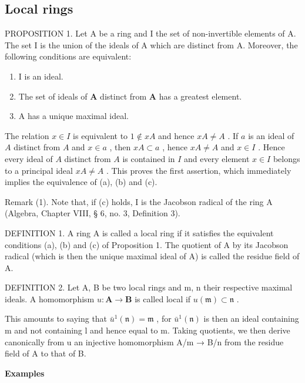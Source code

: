 \subsection{Local rings}

PROPOSITION 1. Let A be a ring and I the set of non-invertible elements of A. The set I is the union of the ideals of A which are distinct from A. Moreover, the following conditions are equivalent:

\begin{enumerate}
\def\labelenumi{(\alph{enumi})}
\item
  I is an ideal.
\item
  The set of ideals of \(\mathbf{A}\) distinct from \(\mathbf{A}\) has a greatest element.
\item
  A has a unique maximal ideal.
\end{enumerate}

The relation \(x \in I\) is equivalent to \(1 \notin xA\) and hence \(xA \neq A\) . If \(a\) is an ideal of \(A\) distinct from \(A\) and \(x \in a\) , then \(xA \subset a\) , hence \(xA \neq A\) and \(x \in I\) . Hence every ideal of \(A\) distinct from \(A\) is contained in \(I\) and every element \(x \in I\) belongs to a principal ideal \(xA \neq A\) . This proves the first assertion, which immediately implies the equivalence of (a), (b) and (c).

Remark (1). Note that, if (c) holds, I is the Jacobson radical of the ring A (Algebra, Chapter VIII, § 6, no. 3, Definition 3).

DEFINITION 1. A ring A is called a local ring if it satisfies the equivalent conditions (a), (b) and (c) of Proposition 1. The quotient of A by its Jacobson radical (which is then the unique maximal ideal of A) is called the residue field of A.

DEFINITION 2. Let A, B be two local rings and m, n their respective maximal ideals. A homomorphism \(u: \mathbf{A} \to \mathbf{B}\) is called local if \(u(\mathfrak{m}) \subset \mathfrak{n}\) .

This amounts to saying that \(\bar{u}^{1}(\mathfrak{n}) = \mathfrak{m}\) , for \(\bar{u}^{1}(\mathfrak{n})\) is then an ideal containing m and not containing l and hence equal to m. Taking quotients, we then derive canonically from u an injective homomorphism A/m → B/n from the residue field of A to that of B.

\textbf{Examples}\par

